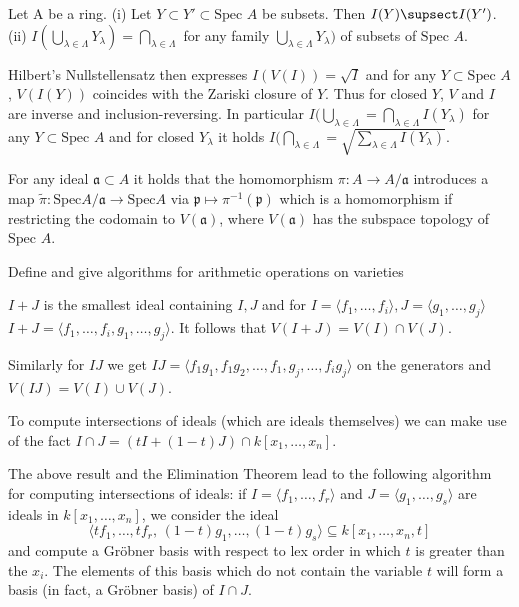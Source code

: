 Let A be a ring.
(i) Let \( Y \subset Y' \subset \text{Spec } A \) be subsets. Then \( I(Y) \supsect I(Y') \).
(ii) \( I(\bigcup_{\lambda \in \Lambda} Y_\lambda) = \bigcap_{\lambda \in \Lambda} \) for any family \( \bigcup_{\lambda \in \Lambda} Y_\lambda) \)
    of subsets of \( \text{Spec } A \).

Hilbert's Nullstellensatz then expresses \( I(V(I)) = \sqrt{I} \) and for any \( Y \subset \text{Spec } A \), \( V(I(Y)) \) coincides
with the Zariski closure of \( Y \). Thus for closed \( Y \), \( V \) and \( I \) are inverse and inclusion-reversing.
In particular
\( I(\bigcup_{\lambda \in \Lambda } = \bigcap_{\lambda \in \Lambda} I(Y_\lambda) \) for any \( Y \subset \text{Spec } A  \)
and for closed \( Y_\lambda \) it holds
\( I(\bigcap_{\lambda \in \Lambda } = \sqrt{ \sum_{\lambda \in \Lambda} I(Y_\lambda)} \).

For any ideal \( \mathfrak{a} \subset A \) it holds that the homomorphism \( \pi : A \to A / \mathfrak{a} \)
introduces a map 
\( \tilde{\pi} : \text{Spec} A / \mathfrak{a} \to \text{Spec} A \) via \( \mathfrak{p} \mapsto \pi^{-1}(\mathfrak{p}) \)
which is a homomorphism if restricting the codomain to \( V(\mathfrak{a}) \), where \( V(\mathfrak{a}) \) has 
the subspace topology of \( \text{Spec } A \).



Define and give algorithms for arithmetic operations on varieties

\( I + J \) is the smallest ideal containing \( I, J \) and for \( I = \langle f_1, \dots, f_i \rangle, J = \langle g_1, \dots, g_j \rangle \)
\( I + J = \langle f_1, \dots, f_i, g_1, \dots, g_j \rangle \).
It follows that \( V(I + J) = V(I) \cap V(J) \).

Similarly for \( IJ \) we get \( IJ = \langle f_1 g_1, f_1 g_2, \dots, f_1, g_j, \dots, f_i g_j \rangle \) on the generators
and \( V(IJ) = V(I) \cup V(J) \).

To compute intersections of ideals (which are ideals themselves) we can make use of the fact 
\( I \cap J = (tI + (1 - t)J) \cap k[x_1, \dots, x_n] \).

The above result and the Elimination Theorem lead to the following algorithm for computing intersections of ideals: 
if \( I = \langle f_1, \ldots, f_r \rangle \) and \( J = \langle g_1, \ldots, g_s \rangle \) are ideals in \( k[x_1, \ldots, x_n] \), 
we consider the ideal
\[
\langle t f_1, \ldots, t f_r,\, (1-t) g_1, \ldots, (1-t) g_s \rangle \subseteq k[x_1, \ldots, x_n, t]
\]
and compute a Gröbner basis with respect to lex order in which \( t \) is greater than the \( x_i \). 
The elements of this basis which do not contain the variable \( t \) will form a basis (in fact, a Gröbner basis) of \( I \cap J \).

